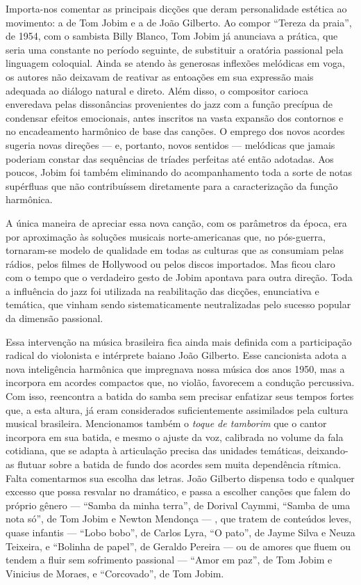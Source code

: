 Importa-nos comentar as principais dicções que deram personalidade
estética ao movimento: a de Tom Jobim e a de João Gilberto. Ao compor
``Tereza da praia'', de 1954, com o sambista Billy Blanco, Tom Jobim já
anunciava a prática, que seria uma constante no período seguinte, de
substituir a oratória passional pela linguagem coloquial. Ainda se
atendo às generosas inflexões melódicas em voga, os autores não deixavam
de reativar as entoações em sua expressão mais adequada ao diálogo
natural e direto. Além disso, o compositor carioca enveredava pelas
dissonâncias provenientes do jazz com a função precípua de condensar
efeitos emocionais, antes inscritos na vasta expansão dos contornos e no
encadeamento harmônico de base das canções. O emprego dos novos acordes
sugeria novas direções --- e, portanto, novos sentidos --- melódicas que
jamais poderiam constar das sequências de tríades perfeitas até então
adotadas. Aos poucos, Jobim foi também eliminando do acompanhamento toda
a sorte de notas supérfluas que não contribuíssem diretamente para a
caracterização da função harmônica.

A única maneira de apreciar essa nova canção, com os parâmetros da
época, era por aproximação às soluções musicais norte-americanas que, no
pós-guerra, tornaram-se modelo de qualidade em todas as culturas que as
consumiam pelas rádios, pelos filmes de Hollywood ou pelos discos
importados. Mas ficou claro com o tempo que o verdadeiro gesto de Jobim
apontava para outra direção. Toda a influência do jazz foi utilizada na
reabilitação das dicções, enunciativa e temática, que vinham sendo
sistematicamente neutralizadas pelo sucesso popular da dimensão
passional.

Essa intervenção na música brasileira fica ainda mais definida com a
participação radical do violonista e intérprete baiano João Gilberto.
Esse cancionista adota a nova inteligência harmônica que impregnava
nossa música dos anos 1950, mas a incorpora em acordes compactos que, no
violão, favorecem a condução percussiva. Com isso, reencontra a batida
do samba sem precisar enfatizar seus tempos fortes que, a esta altura,
já eram considerados suficientemente assimilados pela cultura musical
brasileira. Mencionamos também o \textit{toque de tamborim} que o cantor
incorpora em sua batida, e mesmo o ajuste da voz, calibrada no volume da
fala cotidiana, que se adapta à articulação precisa das unidades
temáticas, deixando-as flutuar sobre a batida de fundo dos acordes sem
muita dependência rítmica. Falta comentarmos sua escolha das letras.
João Gilberto dispensa todo e qualquer excesso que possa resvalar no
dramático, e passa a escolher canções que falem do próprio gênero --- ``Samba da minha terra'', de Dorival Caymmi, ``Samba de uma nota só'', de Tom Jobim e Newton Mendonça --- , que tratem de conteúdos leves, quase
infantis --- ``Lobo bobo'', de Carlos Lyra, ``O pato'', de Jayme Silva e Neuza Teixeira, e ``Bolinha de papel'', de Geraldo Pereira --- ou de
amores que fluem ou tendem a fluir sem sofrimento passional --- ``Amor em
paz'', de Tom Jobim e Vinicius de Moraes, e ``Corcovado'', de Tom Jobim.

